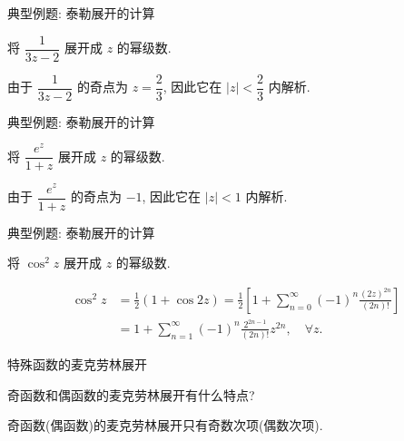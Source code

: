 \begin{frame}{典型例题: 泰勒展开的计算}
\onslide<+->
\begin{example}
将 $\dfrac1{3z-2}$ 展开成 $z$ 的幂级数.
\end{example}
\onslide<+->
\begin{solution}
由于 $\dfrac1{3z-2}$ 的奇点为 $z=\dfrac23$, 因此它在 $|z|<\dfrac23$ 内解析.
\end{solution}
\end{frame}


\begin{frame}{典型例题: 泰勒展开的计算}
\onslide<+->
\begin{example}
将 $\dfrac{e^z}{1+z}$ 展开成 $z$ 的幂级数.
\end{example}
\onslide<+->
\begin{solution}
由于 $\dfrac{e^z}{1+z}$ 的奇点为 $-1$, 因此它在 $|z|<1$ 内解析.
\onslide<+->{
\[\dfrac{e^z}{1+z}=\sum_{n=0}^\infty\left[\sum_{k=0}^n\frac{(-1)^{n-k}}{k!}\right]z^n
=1+\frac12z^2-\frac13z^3+\cdots,\quad|z|<1.\]}
\end{solution}
\end{frame}


\begin{frame}{典型例题: 泰勒展开的计算}
\onslide<+->
\begin{exercise}
将 $\cos^2z$ 展开成 $z$ 的幂级数.
\end{exercise}
\vspace{-0.3\baselineskip}
\onslide<+->
\begin{answer}
\vspace{-\baselineskip}
\begin{align*}
\cos^2z&=\frac12(1+\cos{2z})=\frac12\left[1+\sum_{n=0}^\infty(-1)^n\frac{(2z)^{2n}}{(2n)!}\right]\\
&=1+\sum_{n=1}^\infty(-1)^n\frac{2^{2n-1}}{(2n)!}z^{2n},\quad\forall z.
\end{align*}
\end{answer}
\end{frame}


\begin{frame}{特殊函数的麦克劳林展开}
\onslide<+->\begin{thinking}
奇函数和偶函数的麦克劳林展开有什么特点?
\end{thinking}
\onslide<+->
\begin{answer}
奇函数(偶函数)的麦克劳林展开只有奇数次项(偶数次项).
\end{answer}
\end{frame}

